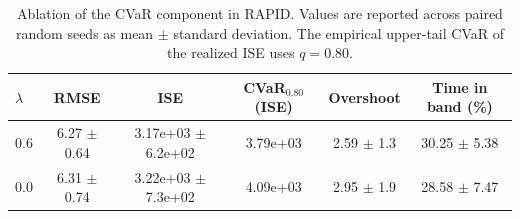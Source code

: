 \begin{table}[!t]
\centering
\caption{Ablation of the CVaR component in RAPID. Values are reported across paired random seeds as mean $\pm$ standard deviation. The empirical upper-tail CVaR of the realized ISE uses $q=0.80$.}
\label{tab:rapid_cvar_ablation}
\small
\begin{tabular}{lccccc}
\hline
$\lambda$ & RMSE & ISE & CVaR$_{0.80}$(ISE) & Overshoot & Time in band (\%) \\
\hline
0.6 & 6.27 $\pm$ 0.64 & 3.17e+03 $\pm$ 6.2e+02 & 3.79e+03 & 2.59 $\pm$ 1.3 & 30.25 $\pm$ 5.38 \\
0.0 & 6.31 $\pm$ 0.74 & 3.22e+03 $\pm$ 7.3e+02 & 4.09e+03 & 2.95 $\pm$ 1.9 & 28.58 $\pm$ 7.47 \\
\hline
\end{tabular}
\end{table}

